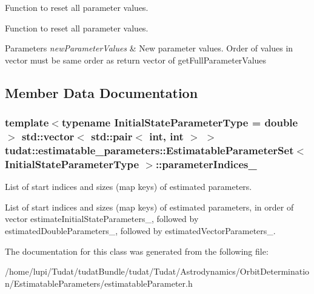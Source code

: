Function to reset all parameter values. 

Function to reset all parameter values. 
\begin{DoxyParams}{Parameters}
{\em new\+Parameter\+Values} & New parameter values. Order of values in vector must be same order as return vector of get\+Full\+Parameter\+Values \\
\hline
\end{DoxyParams}


\subsection{Member Data Documentation}
\subsubsection[{\texorpdfstring{parameter\+Indices\+\_\+}{parameterIndices_}}]{\setlength{\rightskip}{0pt plus 5cm}template$<$typename Initial\+State\+Parameter\+Type  = double$>$ std\+::vector$<$ std\+::pair$<$ int, int $>$ $>$ {\bf tudat\+::estimatable\+\_\+parameters\+::\+Estimatable\+Parameter\+Set}$<$ Initial\+State\+Parameter\+Type $>$\+::parameter\+Indices\+\_\+\hspace{0.3cm}{\ttfamily [protected]}}\hypertarget{classtudat_1_1estimatable__parameters_1_1EstimatableParameterSet_ad129dfa4a6f98530b5456c7b900ab083}{}\label{classtudat_1_1estimatable__parameters_1_1EstimatableParameterSet_ad129dfa4a6f98530b5456c7b900ab083}


List of start indices and sizes (map keys) of estimated parameters. 

List of start indices and sizes (map keys) of estimated parameters, in order of vector estimate\+Initial\+State\+Parameters\+\_\+, followed by estimated\+Double\+Parameters\+\_\+, followed by estimated\+Vector\+Parameters\+\_\+. 

The documentation for this class was generated from the following file\+:\begin{DoxyCompactItemize}
\item 
/home/lupi/\+Tudat/tudat\+Bundle/tudat/\+Tudat/\+Astrodynamics/\+Orbit\+Determination/\+Estimatable\+Parameters/estimatable\+Parameter.\+h\end{DoxyCompactItemize}
